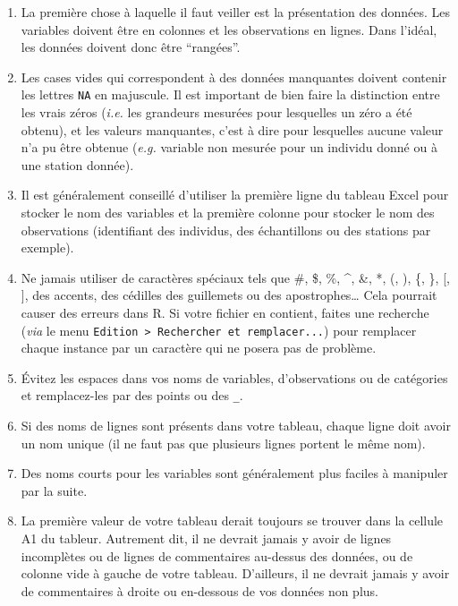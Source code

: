\documentclass[a4paperpaper,]{article}
\providecommand{\tightlist}{%
  \setlength{\itemsep}{0pt}\setlength{\parskip}{0pt}}
\begin{document}
\begin{enumerate}
\def\labelenumi{\arabic{enumi}.}
\tightlist
\item
  La première chose à laquelle il faut veiller est la présentation des données. Les variables doivent être en colonnes et les observations en lignes. Dans l'idéal, les données doivent donc être ``rangées''.
\item
  Les cases vides qui correspondent à des données manquantes doivent contenir les lettres \texttt{NA} en majuscule. Il est important de bien faire la distinction entre les vrais zéros (\emph{i.e.} les grandeurs mesurées pour lesquelles un zéro a été obtenu), et les valeurs manquantes, c'est à dire pour lesquelles aucune valeur n'a pu être obtenue (\emph{e.g.} variable non mesurée pour un individu donné ou à une station donnée).
\item
  Il est généralement conseillé d'utiliser la première ligne du tableau Excel pour stocker le nom des variables et la première colonne pour stocker le nom des observations (identifiant des individus, des échantillons ou des stations par exemple).
\item
  Ne jamais utiliser de caractères spéciaux tels que \#, \$, \%, \^{}, \&, *, (, ), \{, \}, {[}, {]}, des accents, des cédilles des guillemets ou des apostrophes\ldots{} Cela pourrait causer des erreurs dans R. Si votre fichier en contient, faites une recherche (\emph{via} le menu \texttt{Edition\ \textgreater{}\ Rechercher\ et\ remplacer...}) pour remplacer chaque instance par un caractère qui ne posera pas de problème.
\item
  Évitez les espaces dans vos noms de variables, d'observations ou de catégories et remplacez-les par des points ou des \texttt{\_}.
\item
  Si des noms de lignes sont présents dans votre tableau, chaque ligne doit avoir un nom unique (il ne faut pas que plusieurs lignes portent le même nom).
\item
  Des noms courts pour les variables sont généralement plus faciles à manipuler par la suite.
\item
  La première valeur de votre tableau derait toujours se trouver dans la cellule A1 du tableur. Autrement dit, il ne devrait jamais y avoir de lignes incomplètes ou de lignes de commentaires au-dessus des données, ou de colonne vide à gauche de votre tableau. D'ailleurs, il ne devrait jamais y avoir de commentaires à droite ou en-dessous de vos données non plus.
\end{enumerate}
\end{document}
